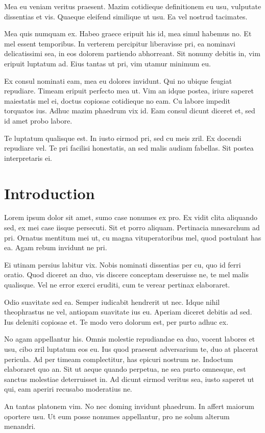 \documentclass{article}
\begin{document}
Mea eu veniam veritus praesent. Mazim cotidieque definitionem eu usu, vulputate dissentias et vis. Quaeque eleifend similique ut usu. Ea vel nostrud tacimates.

Mea quis numquam ex. Habeo graece eripuit his id, mea simul habemus no. Et mel essent temporibus. In verterem percipitur liberavisse pri, ea nominavi delicatissimi sea, in eos dolorem partiendo abhorreant. Sit nonumy debitis in, vim eripuit luptatum ad. Eius tantas ut pri, vim utamur minimum eu.

Ex consul nominati eam, mea eu dolores invidunt. Qui no ubique feugiat repudiare. Timeam eripuit perfecto mea ut. Vim an idque postea, iriure saperet maiestatis mel ei, doctus copiosae cotidieque no eam. Cu labore impedit torquatos ius. Adhuc mazim phaedrum vix id. Eam consul dicunt diceret et, sed id amet probo labore.

Te luptatum qualisque est. In iusto eirmod pri, sed cu meis zril. Ex docendi repudiare vel. Te pri facilisi honestatis, an sed malis audiam fabellas. Sit postea interpretaris ei.
\section{Introduction}
Lorem ipsum dolor sit amet, sumo case nonumes ex pro. Ex vidit clita aliquando sed, ex mei case iisque persecuti. Sit et porro aliquam. Pertinacia mnesarchum ad pri. Ornatus mentitum mei ut, cu magna vituperatoribus mel, quod postulant has ea. Agam rebum invidunt ne pri.

Ei utinam persius labitur vix. Nobis nominati dissentias per cu, quo id ferri oratio. Quod diceret an duo, vis discere conceptam deseruisse ne, te mel malis qualisque. Vel ne error exerci eruditi, cum te verear pertinax elaboraret.


Odio suavitate sed ea. Semper iudicabit hendrerit ut nec. Idque nihil theophrastus ne vel, antiopam suavitate ius eu. Aperiam diceret debitis ad sed. Ius deleniti copiosae et. Te modo vero dolorum est, per purto adhuc ex.

No agam appellantur his. Omnis molestie repudiandae ea duo, vocent labores et usu, cibo zril luptatum eos eu. Ius quod praesent adversarium te, duo at placerat pericula. Ad per timeam complectitur, has epicuri nostrum ne. Indoctum elaboraret quo an. Sit ut aeque quando perpetua, ne sea purto omnesque, est sanctus molestiae deterruisset in. Ad dicunt eirmod veritus sea, iusto saperet ut qui, eam aperiri recusabo moderatius ne.

An tantas platonem vim. No nec doming invidunt phaedrum. In affert maiorum oportere usu. Ut eum posse nonumes appellantur, pro ne solum alterum menandri.
\end{document}
